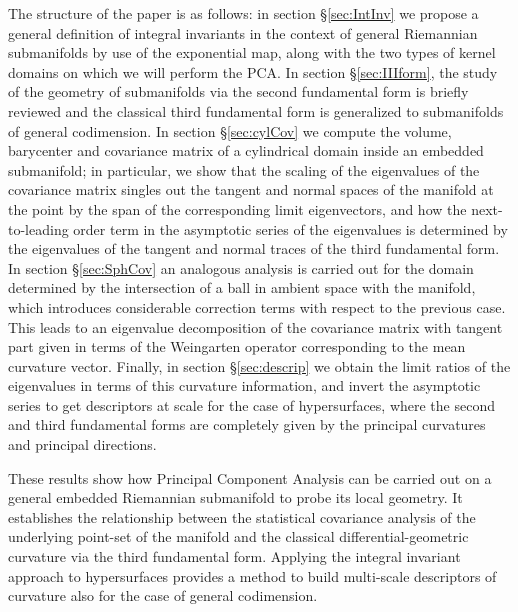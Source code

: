 \documentclass[letterpaper, reqno, 11pt]{amsart}
\theoremstyle{definition}
\theoremstyle{remark}
\numberwithin{equation}{section}
\begin{document}
The structure of the paper is as follows: in section \S\ref{sec:IntInv} we propose a general definition of integral invariants in the context of general Riemannian submanifolds by use of the exponential map, along with the two types of kernel domains on which we will perform the PCA. In section \S\ref{sec:IIIform}, the study of the geometry of submanifolds via the second fundamental form is briefly reviewed and the classical third fundamental form is generalized to submanifolds of general codimension. In section \S\ref{sec:cylCov} we compute the volume, barycenter and covariance matrix of a cylindrical domain inside an embedded submanifold; in particular, we show that the scaling of the eigenvalues of the covariance matrix singles out the tangent and normal spaces of the manifold at the point by the span of the corresponding limit eigenvectors, and how the next-to-leading order term in the asymptotic series of the eigenvalues is determined by the eigenvalues of the tangent and normal traces of the third fundamental form. In section \S\ref{sec:SphCov} an analogous analysis is carried out for the domain determined by the intersection of a ball in ambient space  with the manifold, which introduces considerable correction terms with respect to the previous case. This leads to an eigenvalue decomposition of the covariance matrix with tangent part given in terms of the Weingarten operator corresponding to the mean curvature vector. Finally, in section \S\ref{sec:descrip} we obtain the limit ratios of the eigenvalues in terms of this curvature information, and invert the asymptotic series to get descriptors at scale for the case of hypersurfaces, where the second and third fundamental forms are completely given by the principal curvatures and principal directions.

These results show how Principal Component Analysis can be carried out on a general embedded Riemannian submanifold to probe its local geometry. It establishes the relationship between the statistical covariance analysis of the underlying point-set of the manifold and the classical differential-geometric curvature via the third fundamental form. Applying the integral invariant approach to hypersurfaces provides a method to build multi-scale descriptors of curvature also for the case of general codimension.


\end{document}
